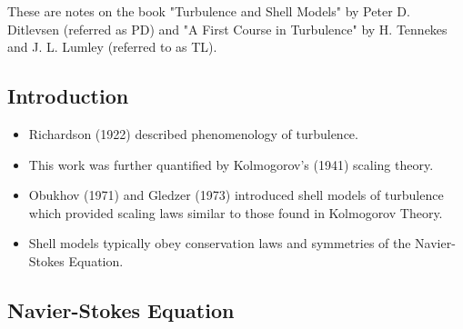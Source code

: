\documentclass[11pt]{article}
\begin{document}
These are notes on the book "Turbulence and Shell Models" by Peter D. Ditlevsen (referred as PD) and "A First Course in Turbulence" by H. Tennekes and J. L. Lumley (referred to as TL).

\subsection{Introduction}

\begin{itemize}
\item Richardson (1922) described phenomenology of turbulence.
\item This work was further quantified by Kolmogorov's (1941) scaling theory.
\item Obukhov (1971) and Gledzer (1973) introduced shell models of turbulence which provided scaling laws similar to those found in Kolmogorov Theory. 
\item Shell models typically obey conservation laws and symmetries of the Navier-Stokes Equation. 
\end{itemize}

\subsection{Navier-Stokes Equation}
\end{document}
